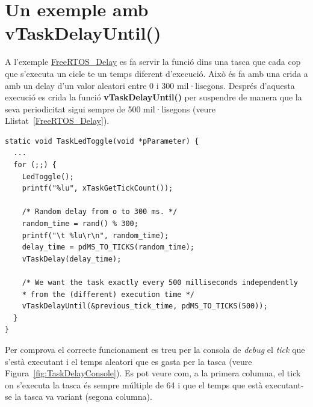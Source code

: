 \section{Un exemple amb vTaskDelayUntil()}

A l'exemple \href{https://github.com/mariusmm/cursembedded/tree/master/Simplicity/FreeRTOS_Delay}{FreeRTOS\_Delay} es fa servir la funció  dins una tasca que cada cop que s'executa un cicle te un temps diferent d'execució. Això és fa amb una crida a  amb un delay d'un valor aleatori entre 0 i 300 mil·lisegons. 
Després d'aquesta execució es crida la funció {\bf vTaskDelayUntil()} per suspendre de manera que la seva periodicitat sigui sempre de 500 mil·lisegons (veure Llistat~\ref{FreeRTOS_Delay}). 


\begin{lstlisting}[style=customc, label=FreeRTOS_Delay, caption=Tasca de l'exemple FreeRTOS\_Delay]
static void TaskLedToggle(void *pParameter) {
  ...
  for (;;) {
    LedToggle();
    printf("%lu", xTaskGetTickCount());

    /* Random delay from o to 300 ms. */
    random_time = rand() % 300;
    printf("\t %lu\r\n", random_time);
    delay_time = pdMS_TO_TICKS(random_time);
    vTaskDelay(delay_time);

    /* We want the task exactly every 500 milliseconds independently
    * from the (different) execution time */
    vTaskDelayUntil(&previous_tick_time, pdMS_TO_TICKS(500));
  }
}
\end{lstlisting}

Per comprova el correcte funcionament es treu per la consola de {\em debug} el {\em tick} que s'està executant i el temps aleatori que es gasta per la tasca (veure Figura~\ref{fig:TaskDelayConsole}). Es pot veure com, a la primera columna, el tick on s'executa la tasca és sempre múltiple de 64 i que el temps que està executant-se la tasca va variant (segona columna).

